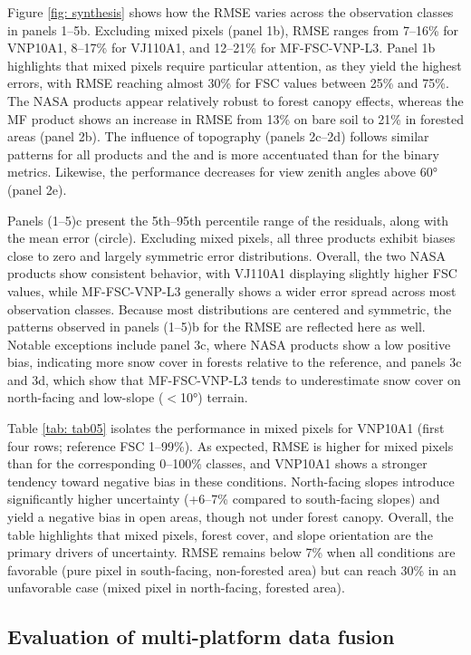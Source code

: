 \documentclass[tc, manuscript]{copernicus}
\begin{document}
Figure \ref{fig: synthesis} shows how the RMSE varies across the observation classes in panels 1–5b. Excluding mixed pixels (panel 1b), RMSE ranges from 7–16\% for VNP10A1, 8–17\% for VJ110A1, and 12–21\% for MF-FSC-VNP-L3. Panel 1b highlights that mixed pixels require particular attention, as they yield the highest errors, with RMSE reaching almost 30\% for FSC values between 25\% and 75\%. The NASA products appear relatively robust to forest canopy effects, whereas the MF product shows an increase in RMSE from 13\% on bare soil to 21\% in forested areas (panel 2b). The influence of topography (panels 2c–2d) follows similar patterns for all products and the  and is more accentuated than for the binary metrics. Likewise, the performance decreases for view zenith angles above 60° (panel 2e).

Panels (1–5)c present the 5th–95th percentile range of the residuals, along with the mean error (circle). Excluding mixed pixels, all three products exhibit biases close to zero and largely symmetric error distributions. Overall, the two NASA products show consistent behavior, with VJ110A1 displaying slightly higher FSC values, while MF-FSC-VNP-L3 generally shows a wider error spread across most observation classes. Because most distributions are centered and symmetric, the patterns observed in panels (1–5)b for the RMSE are reflected here as well. Notable exceptions include panel 3c, where NASA products show a low positive bias, indicating more snow cover in forests relative to the reference, and panels 3c and 3d, which show that MF-FSC-VNP-L3 tends to underestimate snow cover on north-facing and low-slope ($<$10°) terrain.


Table \ref{tab: tab05} isolates the performance in mixed pixels for VNP10A1 (first four rows; reference FSC 1–99\%). As expected, RMSE is higher for mixed pixels than for the corresponding 0–100\% classes, and VNP10A1 shows a stronger tendency toward negative bias in these conditions. North-facing slopes introduce significantly higher uncertainty (+6–7\% compared to south-facing slopes) and yield a negative bias in open areas, though not under forest canopy. Overall, the table highlights that mixed pixels, forest cover, and slope orientation are the primary drivers of uncertainty. RMSE remains below 7\% when all conditions are favorable (pure pixel in south-facing, non-forested area) but can reach 30\% in an unfavorable case (mixed pixel in north-facing, forested area).

\subsection{Evaluation of multi-platform data fusion}
\label{subsec: res_composite}
\end{document}
